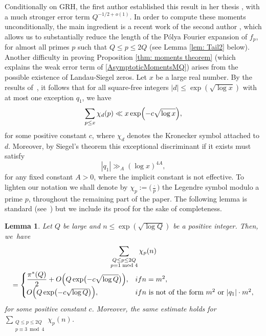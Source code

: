 \documentclass[10pt]{amsart}
\theoremstyle{plain}
\newtheorem{lem}[thm]{Lemma}
\theoremstyle{definition}
\newcommand{\legendre}[2]{\bigl(\tfrac{#1}{#2}\bigr)}
\begin{document}
Conditionally on GRH, the first author established this result in her thesis \cite{Hu}, with a much stronger error term $Q^{-1/2+o(1)}$. In order to compute these moments unconditionally, the main ingredient is a recent work of the second author \cite{La}, which allows us to substantially reduce the length of the Pólya Fourier expansion of $f_p$, for almost all primes $p$ such that $Q\leq p\leq 2Q$ (see Lemma \ref{lem: Tail2} below).
Another difficulty in proving Proposition \ref{thm: moments theorem} (which explains the weak error term of \eqref{AsymptoticMomentsMQ}) arises from the possible existence of Landau-Siegel zeros. Let $x$ be a large real number. By the results of~\hbox{\cite[Chap.\,20]{Da}}, it follows that for all square-free integers $|d|\leq \exp(\sqrt{\log x})$ with at most one exception $q_1$, we have
\begin{equation}\label{NoExceptional}
\sum_{p\leq x} \chi_d(p) \ll x\exp\Bigl(-c\sqrt{\log x}\Bigr),
\end{equation}
for some positive constant $c$, where $\chi_d$ denotes the Kronecker symbol attached to $d$.
Moreover, by Siegel's theorem this exceptional discriminant if it exists must satisfy
\begin{equation}\label{LowerBoundSiegel}
|q_1|\gg_A (\log x)^{4A},
\end{equation}
for any fixed constant $A>0$, where the implicit constant is not effective.
To lighten our notation we shall denote by $\chi_p:=\legendre{\cdot}{p}$ the Legendre symbol modulo a prime $p$, throughout the remaining part of the paper.
The following lemma is standard (see~\cite{Da}) but we include its proof for the sake of completeness.
\begin{lem}\label{Siegel}
Let $Q$ be large and $n\leq \exp\left(\sqrt{\log Q}\right)$ be a positive integer. Then, we~have
\begin{multline*}
\sum_{\substack{Q\leq p\leq 2Q\\ p\equiv 1 \bmod 4}} \chi_{p}(n)\\
=\begin{cases} \displaystyle{\frac{\pi^*(Q)}{2}}+O\Bigl(Q\exp\bigl(-c\sqrt{\log Q}\bigr)\Bigr), & \textup{if } n= m^2,\\
O\Bigl(Q\exp\bigl(-c\sqrt{\log Q}\bigr)\Bigr), & \textup{if } n \text{ is not of the form } m^2 \text{ or } |q_1| \cdot m^2,\end{cases}
\end{multline*}
for some positive constant $c$.
Moreover, the same estimate holds for $ \sum_{\substack{Q\leq p\leq 2Q\\ p\equiv 3 \bmod 4}} \chi_{p}(n)$.
\end{lem}
\end{document}
